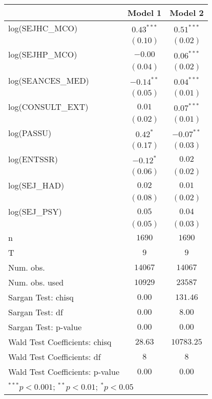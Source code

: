 
\usepackage{booktabs}

\begin{tabular}{l c c}
\toprule
 & Model 1 & Model 2 \\
\midrule
log(SEJHC\_MCO)                 & $0.43^{***}$ & $0.51^{***}$ \\
                                & $(0.10)$     & $(0.02)$     \\
log(SEJHP\_MCO)                 & $-0.00$      & $0.06^{***}$ \\
                                & $(0.04)$     & $(0.02)$     \\
log(SEANCES\_MED)               & $-0.14^{**}$ & $0.04^{***}$ \\
                                & $(0.05)$     & $(0.01)$     \\
log(CONSULT\_EXT)               & $0.01$       & $0.07^{***}$ \\
                                & $(0.02)$     & $(0.01)$     \\
log(PASSU)                      & $0.42^{*}$   & $-0.07^{**}$ \\
                                & $(0.17)$     & $(0.03)$     \\
log(ENTSSR)                     & $-0.12^{*}$  & $0.02$       \\
                                & $(0.06)$     & $(0.02)$     \\
log(SEJ\_HAD)                   & $0.02$       & $0.01$       \\
                                & $(0.08)$     & $(0.02)$     \\
log(SEJ\_PSY)                   & $0.05$       & $0.04$       \\
                                & $(0.05)$     & $(0.03)$     \\
\midrule
n                               & $1690$       & $1690$       \\
T                               & $9$          & $9$          \\
Num. obs.                       & $14067$      & $14067$      \\
Num. obs. used                  & $10929$      & $23587$      \\
Sargan Test: chisq              & $0.00$       & $131.46$     \\
Sargan Test: df                 & $0.00$       & $8.00$       \\
Sargan Test: p-value            & $0.00$       & $0.00$       \\
Wald Test Coefficients: chisq   & $28.63$      & $10783.25$   \\
Wald Test Coefficients: df      & $8$          & $8$          \\
Wald Test Coefficients: p-value & $0.00$       & $0.00$       \\
\bottomrule
\multicolumn{3}{l}{\scriptsize{$^{***}p<0.001$; $^{**}p<0.01$; $^{*}p<0.05$}}
\end{tabular}
